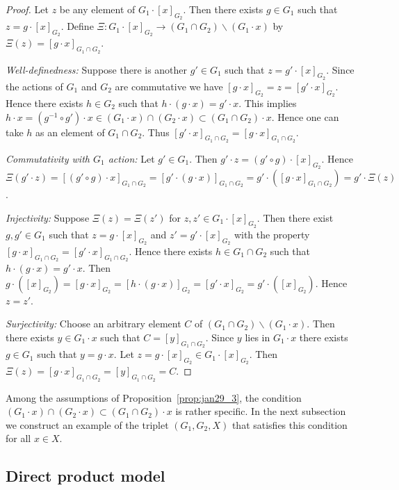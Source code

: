 \documentclass[pdftex]{sigma}
\begin{document}
\begin{proof}
Let $z$ be any element of $G_1 \cdot [x]_{G_2}$.
Then there exists $g \in G_1$ such that $z = g \cdot [x]_{G_2}$.
Def\/ine $\varXi: G_1 \cdot [x]_{G_2} \rightarrow (G_1 \cap G_2) \backslash (G_1 \cdot x)$
by $\varXi (z) = [g \cdot x]_{G_1 \cap G_2}$.

\textit{Well-definedness:} Suppose there is another $g' \in G_1$ such that $z = g' \cdot  [x]_{G_2}$.
Since the actions of $G_1$ and $G_2$ are commutative we have
$[g \cdot x]_{G_2} =z = [g' \cdot x]_{G_2}$.
Hence there exists $h \in G_2$ such that $h \cdot (g \cdot x) = g' \cdot x$.
This implies $h \cdot x = (g^{-1} \circ g') \cdot x \in (G_1 \cdot x) \cap (G_2 \cdot x) \subset (G_1 \cap G_2) \cdot x$.
Hence one can take $h$ as an element of $G_1 \cap G_2$.
Thus $[g' \cdot x]_{G_1 \cap G_2} = [g \cdot x]_{G_1 \cap G_2}$.

\textit{Commutativity with $G_1$ action:}
Let $g' \in G_1$.
Then $g' \cdot z = (g' \circ g) \cdot [x]_{G_2}$.
Hence $\varXi(g' \cdot z) = [(g' \circ g) \cdot x]_{G_1 \cap G_2} =
[ g' \cdot (g \cdot x)]_{G_1 \cap G_2} =
g' \cdot ([g \cdot x]_{G_1 \cap G_2}) = g' \cdot \varXi (z)$.

\textit{Injectivity:} Suppose $\varXi (z) = \varXi (z')$ for $z,z' \in G_1 \cdot [x]_{G_2}$.
Then there exist $g, g' \in G_1$ such that $z = g \cdot [x]_{G_2}$ and $z' = g' \cdot [x]_{G_2}$
with the property $[g \cdot x]_{G_1 \cap G_2} = [g' \cdot x]_{G_1 \cap G_2}$.
Hence there exists $h \in G_1 \cap G_2$ such that $h \cdot (g \cdot x) = g' \cdot x$.
Then $g \cdot ([x]_{G_2}) = [g \cdot x]_{G_2} = [h \cdot (g \cdot x)]_{G_2} = [g' \cdot x]_{G_2} = g' \cdot ([x]_{G_2})$.
Hence $z=z'$.

\textit{Surjectivity:} Choose an arbitrary element $C$ of $(G_1 \cap G_2) \backslash (G_1 \cdot x)$.
Then there exists $y \in G_1 \cdot x$ such that $C = [y]_{G_1 \cap G_2}$.
Since $y$ lies in $G_1 \cdot x$ there exists $g \in G_1$ such that $y = g \cdot x$.
Let $z = g \cdot [x]_{G_2} \in G_1 \cdot [x]_{G_2}$.
Then $\varXi (z) = [g \cdot x]_{G_1 \cap G_2} = [y]_{G_1 \cap G_2} =C$.
\end{proof}

Among the assumptions of Proposition~\ref{prop:jan29_3}, the condition $(G_1 \cdot x) \cap (G_2 \cdot x) \subset (G_1 \cap G_2) \cdot x$
is rather specif\/ic.
In the next subsection we construct an example of the triplet $(G_1,G_2,X)$ that satisf\/ies this condition for all $x \in X$.


\subsection{Direct product model}\label{subsec:2_2}
\end{document}

